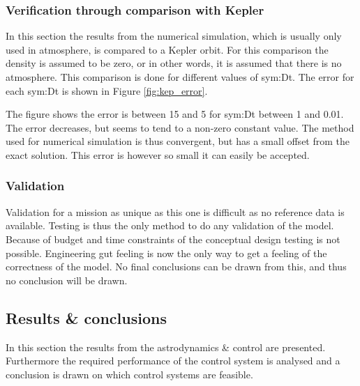 \subsubsection{Verification through comparison with Kepler}
\label{sec:astroverf}

In this section the results from the numerical simulation, which is usually only used in atmosphere, is compared to a Kepler orbit. For this comparison the density is assumed to be zero, or in other words, it is assumed that there is no atmosphere. This comparison is done for different values of \gls{sym:Dt}. The error for each \gls{sym:Dt} is shown in Figure \ref{fig:kep_error}.


The figure shows the error is between 15 and 5 for \gls{sym:Dt} between 1 and 0.01. The error decreases, but seems to tend to a non-zero constant value. The method used for numerical simulation is thus convergent, but has a small offset from the exact solution. This error is however so small it can easily be accepted.

\subsubsection{Validation}
\label{sec:astroval}

Validation for a mission as unique as this one is difficult as no reference data is available. Testing is thus the only method to do any validation of the model. Because of budget and time constraints of the conceptual design testing is not possible. Engineering gut feeling is now the only way to get a feeling of the correctness of the model. No final conclusions can be drawn from this, and thus no conclusion will be drawn.

\subsection{Results \& conclusions}
\label{sec:astrores}
In this section the results from the astrodynamics \& control are presented. Furthermore the required performance of the control system is analysed and a conclusion is drawn on which control systems are feasible.

